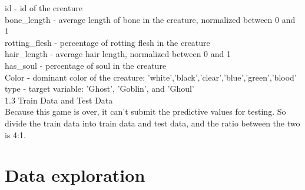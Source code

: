 \hspace*{0.4cm}id - id of the creature\\
\hspace*{0.4cm}bone_length - average length of bone in the creature, normalized between 0 and 1\\
\hspace*{0.4cm}rotting_flesh - percentage of rotting flesh in the creature\\
\hspace*{0.4cm}hair_length - average hair length, normalized between 0 and 1\\
\hspace*{0.4cm}has_soul - percentage of soul in the creature\\
\hspace*{0.4cm}Color - dominant color of the creature: 'white','black','clear','blue','green','blood'\\
\hspace*{0.4cm}type - target variable: 'Ghost', 'Goblin', and 'Ghoul'\\
\hspace*{0.4cm}1.3 Train Data and Test Data\\
\hspace*{0.4cm}Because this game is over, it can't submit the predictive values for testing. So divide the train data into train data and test data, and the ratio between the two is 4:1.\\

\section{Data exploration} \label{sec-data_exploration}

